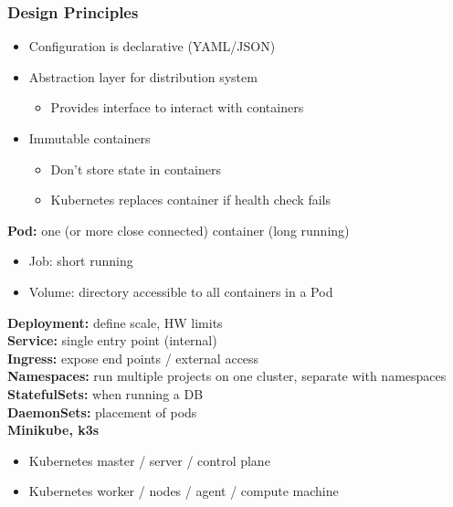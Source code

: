 \subsubsection{Design Principles}
\begin{itemize}
    \item Configuration is declarative (YAML/JSON)
    \item Abstraction layer for distribution system
    \begin{itemize}
        \item Provides interface to interact with containers
    \end{itemize}
    \item Immutable containers
    \begin{itemize}
        \item Don't store state in containers
        \item Kubernetes replaces container if health check fails
    \end{itemize}
\end{itemize}
\textbf{Pod:} one (or more close connected) container (long running)
\begin{itemize}
    \item Job: short running
    \item Volume: directory accessible to all containers in a Pod
\end{itemize}
\textbf{Deployment:} define scale, HW limits\\
\textbf{Service:} single entry point (internal)\\
\textbf{Ingress:} expose end points / external access\\
\textbf{Namespaces:} run multiple projects on one cluster, separate with namespaces\\
\textbf{StatefulSets:} when running a DB\\
\textbf{DaemonSets:} placement of pods\\
\textbf{Minikube, k3s}
\begin{itemize}
    \item Kubernetes master / server / control plane
    \item Kubernetes worker / nodes / agent / compute machine
\end{itemize}

